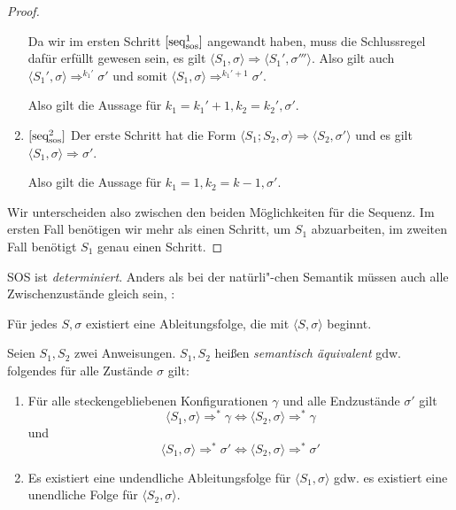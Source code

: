 \begin{proof}
\begin{enumerate}
            Da wir im ersten Schritt $\infruleSos[1]{seq}$ angewandt haben, muss die Schlussregel dafür erfüllt gewesen sein, \dh{} es gilt $\langle S_1, \sigma \rangle \Rightarrow \langle S_1', \sigma''' \rangle$. Also gilt auch $\langle S_1', \sigma \rangle \Rightarrow^{k_1'} \sigma'$ und somit $\langle S_1, \sigma \rangle \Rightarrow^{k_1'+1} \sigma'$.

            Also gilt die Aussage für $k_1 = k_1' + 1, k_2 = k_2', \sigma'$.
        \item $\infruleSos[2]{seq}$ Der erste Schritt hat die Form $\langle S_1; S_2, \sigma \rangle \Rightarrow \langle S_2, \sigma' \rangle$ und es gilt $\langle S_1, \sigma \rangle \Rightarrow \sigma'$.

            Also gilt die Aussage für $k_1 = 1, k_2 = k - 1, \sigma'$.
    \end{enumerate}

    Wir unterscheiden also zwischen den beiden Möglichkeiten für die Sequenz. Im ersten Fall benötigen wir mehr als einen Schritt, um $S_1$ abzuarbeiten, im zweiten Fall benötigt $S_1$ genau einen Schritt.
\end{proof}


\par\medskip
\begin{lemma}[Determiniertheit]
    SOS ist \emph{determiniert}. Anders als bei der natürli"-chen Semantik müssen auch alle Zwischenzustände gleich sein, \dh{}:

        Für jedes $S, \sigma$ existiert eine Ableitungsfolge, die mit $\langle S, \sigma \rangle$ beginnt.
\end{lemma}


\par\medskip
\begin{definition}
    Seien $S_1, S_2$ zwei Anweisungen. $S_1, S_2$ heißen \emph{semantisch äquivalent} gdw. folgendes für alle Zustände $\sigma$ gilt:

    \begin{enumerate}
        \item Für alle steckengebliebenen Konfigurationen $\gamma$ und alle Endzustände $\sigma'$ gilt
            \[
                \langle S_1, \sigma \rangle \Rightarrow^* \gamma \Leftrightarrow \langle S_2, \sigma \rangle \Rightarrow^* \gamma
            \]
            und
            \[
                \langle S_1, \sigma \rangle \Rightarrow^* \sigma' \Leftrightarrow \langle S_2, \sigma \rangle \Rightarrow^* \sigma'
            \]
        \item Es existiert eine undendliche Ableitungsfolge für $\langle S_1, \sigma \rangle$ gdw. es existiert eine unendliche Folge für $\langle S_2, \sigma \rangle$.
    \end{enumerate}
\end{definition}

